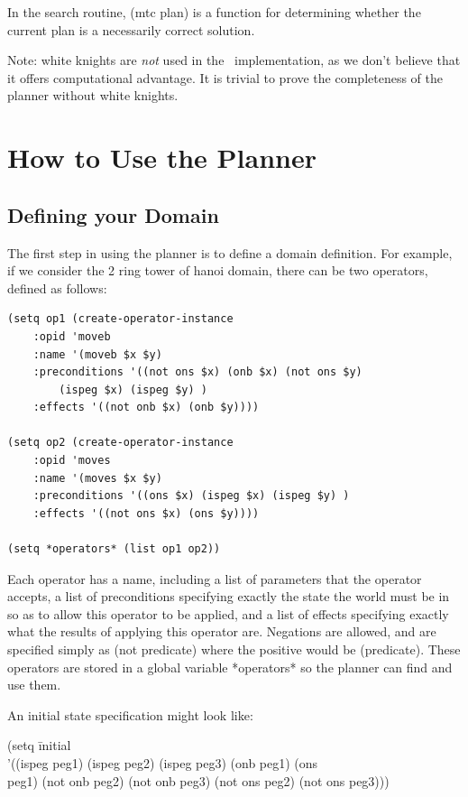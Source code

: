 In the search routine, (mtc plan) is a function for determining whether the
current plan is a necessarily correct solution.

Note:  white knights are {\em not} used in the \tweak\ implementation,
as we don't believe that it offers computational advantage.  It is
trivial to prove the completeness of the planner without white knights.

\section{How to Use the Planner}

\subsection{Defining your Domain}

The first step in using the planner is to define a domain definition.
For example, if we consider the 2 ring tower of hanoi domain, there
can be two operators, defined as follows:

\begin{verbatim}
(setq op1 (create-operator-instance 
	:opid 'moveb 	 
	:name '(moveb $x $y) 	 
	:preconditions '((not ons $x) (onb $x) (not ons $y) 
		(ispeg $x) (ispeg $y) ) 	 
	:effects '((not onb $x) (onb $y))))

(setq op2 (create-operator-instance 	 
	:opid 'moves 	 
	:name '(moves $x $y) 	 
	:preconditions '((ons $x) (ispeg $x) (ispeg $y) )
	:effects '((not ons $x) (ons $y))))

(setq *operators* (list op1 op2))
\end{verbatim}

Each operator has a name, including a list of parameters that the
operator accepts, a list of preconditions specifying exactly the state
the world must be in so as to allow this operator to be applied, and a
list of effects specifying exactly what the results of applying this
operator are.  Negations are allowed, and are specified simply as (not
predicate) where the positive would be (predicate). These operators
are stored in a global variable *operators* so the planner can find
and use them.


An initial state specification might look like:

\begin{tabbing}
(setq \=initial \\
\>	'((ispeg peg1) (ispeg peg2) (ispeg peg3) (onb peg1) (ons\\
\>	peg1) (not onb peg2) (not onb peg3) (not ons peg2) (not ons peg3)))\\
\end{tabbing}

